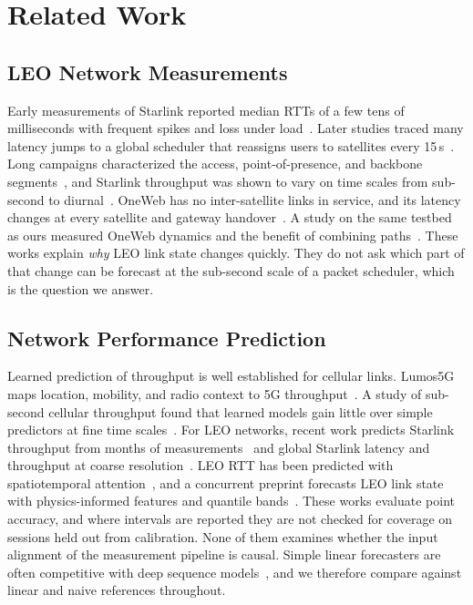 \section{Related Work}
\label{sec:related}
\subsection{LEO Network Measurements}
Early measurements of Starlink reported median RTTs of a few tens of milliseconds with frequent spikes and loss under load~\cite{michel2022first}. Later studies traced many latency jumps to a global scheduler that reassigns users to satellites every 15\,s~\cite{mohan2024multifaceted,tanveer2023making}. Long campaigns characterized the access, point-of-presence, and backbone segments~\cite{pan2023measuring}, and Starlink throughput was shown to vary on time scales from sub-second to diurnal~\cite{garcia2023multitimescale}. OneWeb has no inter-satellite links in service, and its latency changes at every satellite and gateway handover~\cite{zhao2025measuring}. A study on the same testbed as ours measured OneWeb dynamics and the benefit of combining paths~\cite{perrin2025measurement}. These works explain \emph{why} LEO link state changes quickly. They do not ask which part of that change can be forecast at the sub-second scale of a packet scheduler, which is the question we answer.

\subsection{Network Performance Prediction}
Learned prediction of throughput is well established for cellular links. Lumos5G maps location, mobility, and radio context to 5G throughput~\cite{narayanan2020lumos5g}. A study of sub-second cellular throughput found that learned models gain little over simple predictors at fine time scales~\cite{basit2024predictability}. For LEO networks, recent work predicts Starlink throughput from months of measurements~\cite{liu2025vivisecting} and global Starlink latency and throughput at coarse resolution~\cite{benghe2026horizon}. LEO RTT has been predicted with spatiotemporal attention~\cite{tian2025attention}, and a concurrent preprint forecasts LEO link state with physics-informed features and quantile bands~\cite{chi2026reading}. These works evaluate point accuracy, and where intervals are reported they are not checked for coverage on sessions held out from calibration. None of them examines whether the input alignment of the measurement pipeline is causal. Simple linear forecasters are often competitive with deep sequence models~\cite{zeng2023transformers}, and we therefore compare against linear and naive references throughout.

